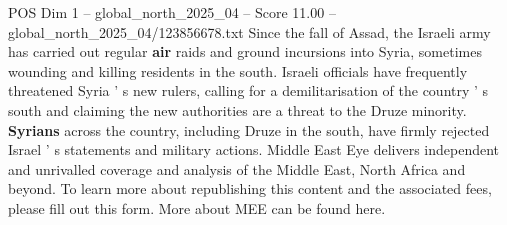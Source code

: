 \begin{textsample}{POS Dim 1 – global\_north\_2025\_04 – Score 11.00 – global\_north\_2025\_04/123856678.txt}
Since the fall of Assad, the Israeli army has carried out regular \textbf{air} raids and ground incursions into Syria, sometimes wounding and killing residents in the south.
Israeli officials have frequently threatened Syria ' s new rulers, calling for a demilitarisation of the country ' s south and claiming the new authorities are a threat to the Druze minority. \textbf{Syrians} across the country, including Druze in the south, have firmly rejected Israel ' s statements and military actions.
Middle East Eye delivers independent and unrivalled coverage and analysis of the Middle East, North Africa and beyond.
To learn more about republishing this content and the associated fees, please fill out this form.
More about MEE can be found here.

\end{textsample}
